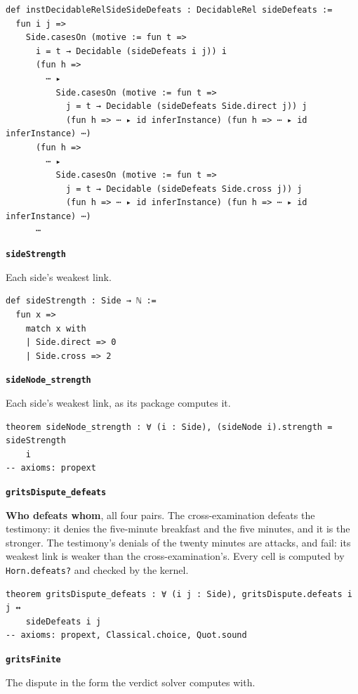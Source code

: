 \documentclass[11pt]{article}
\begin{document}
{\small\begin{verbatim}
def instDecidableRelSideSideDefeats : DecidableRel sideDefeats :=
  fun i j =>
    Side.casesOn (motive := fun t =>
      i = t → Decidable (sideDefeats i j)) i
      (fun h =>
        ⋯ ▸
          Side.casesOn (motive := fun t =>
            j = t → Decidable (sideDefeats Side.direct j)) j
            (fun h => ⋯ ▸ id inferInstance) (fun h => ⋯ ▸ id inferInstance) ⋯)
      (fun h =>
        ⋯ ▸
          Side.casesOn (motive := fun t =>
            j = t → Decidable (sideDefeats Side.cross j)) j
            (fun h => ⋯ ▸ id inferInstance) (fun h => ⋯ ▸ id inferInstance) ⋯)
      ⋯
\end{verbatim}}
\par\medskip\noindent\textbf{\texttt{side\allowbreak{}Strength}}\par\nobreak\noindent
Each side’s weakest link.

{\small\begin{verbatim}
def sideStrength : Side → ℕ :=
  fun x =>
    match x with
    | Side.direct => 0
    | Side.cross => 2
\end{verbatim}}
\par\medskip\noindent\textbf{\texttt{side\allowbreak{}Node\_\allowbreak{}strength}}\par\nobreak\noindent
Each side’s weakest link, as its package computes it.

{\small\begin{verbatim}
theorem sideNode_strength : ∀ (i : Side), (sideNode i).strength = sideStrength
    i
-- axioms: propext
\end{verbatim}}
\par\medskip\noindent\textbf{\texttt{grits\allowbreak{}Dispute\_\allowbreak{}defeats}}\par\nobreak\noindent
\textbf{Who defeats whom}, all four pairs. The cross-examination defeats the testimony: it denies the five-minute breakfast and the five minutes, and it is the stronger. The testimony’s denials of the twenty minutes are attacks, and fail: its weakest link is weaker than the cross-examination’s. Every cell is computed by \texttt{Horn.defeats?} and checked by the kernel.

{\small\begin{verbatim}
theorem gritsDispute_defeats : ∀ (i j : Side), gritsDispute.defeats i j ↔
    sideDefeats i j
-- axioms: propext, Classical.choice, Quot.sound
\end{verbatim}}
\par\medskip\noindent\textbf{\texttt{grits\allowbreak{}Finite}}\par\nobreak\noindent
The dispute in the form the verdict solver computes with.
\end{document}
